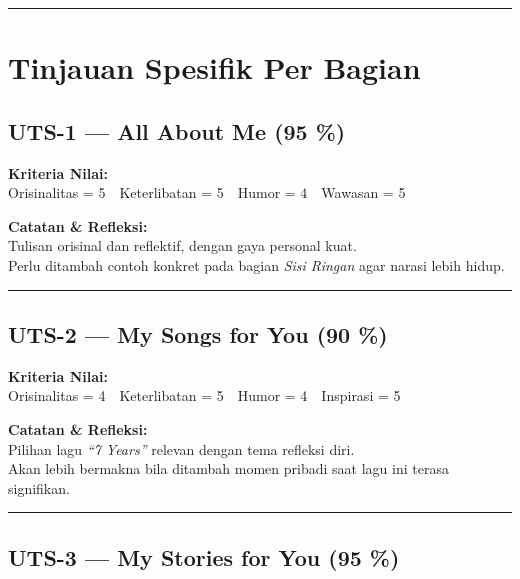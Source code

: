 \documentclass[
  letterpaper,
  DIV=11,
  numbers=noendperiod]{scrreprt}
\begin{document}
\begin{center}\rule{0.5\linewidth}{0.5pt}\end{center}

\section*{Tinjauan Spesifik Per
Bagian}\label{tinjauan-spesifik-per-bagian}


\subsection*{UTS-1 --- All About Me (95
\%)}\label{uts-1-all-about-me-95}

\textbf{Kriteria Nilai:}\\
Orisinalitas = 5 Keterlibatan = 5 Humor = 4 Wawasan = 5

\textbf{Catatan \& Refleksi:}\\
Tulisan orisinal dan reflektif, dengan gaya personal kuat.\\
Perlu ditambah contoh konkret pada bagian \emph{Sisi Ringan} agar narasi
lebih hidup.

\begin{center}\rule{0.5\linewidth}{0.5pt}\end{center}

\subsection*{UTS-2 --- My Songs for You (90
\%)}\label{uts-2-my-songs-for-you-90}

\textbf{Kriteria Nilai:}\\
Orisinalitas = 4 Keterlibatan = 5 Humor = 4 Inspirasi = 5

\textbf{Catatan \& Refleksi:}\\
Pilihan lagu \emph{``7 Years''} relevan dengan tema refleksi diri.\\
Akan lebih bermakna bila ditambah momen pribadi saat lagu ini terasa
signifikan.

\begin{center}\rule{0.5\linewidth}{0.5pt}\end{center}

\subsection*{UTS-3 --- My Stories for You (95
\%)}\label{uts-3-my-stories-for-you-95}
\end{document}

